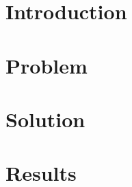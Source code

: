 
\section{Introduction}
\label{sec:introduction}


\section{Problem}
\label{sec:problem}
	


\section{Solution}
\label{sec:approach}


\section{Results}
\label{sec:results}


%